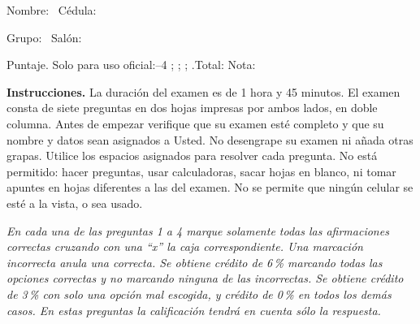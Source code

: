 \documentclass[11pt]{article}
\begin{document}
\examheader

\vspace{4pt}
\noindent Nombre: \dotfill\ Cédula: \dotfill

\vspace{4pt}
\noindent Grupo: \dotfill\ Salón: \dotfill

\vspace{4pt}
\noindent Puntaje. Solo para uso oficial:--4 \dotfill; \dotfill; \dotfill; \dotfill.\quad Total: \dotfill\quad Nota: \dotfill

\vspace{6pt}
\noindent\textbf{Instrucciones.} La duración del examen es de 1 hora y 45 minutos. El examen consta de siete preguntas en dos hojas impresas por ambos lados, en doble columna. Antes de empezar verifique que su examen esté completo y que su nombre y datos sean asignados a Usted. No desengrape su examen ni añada otras grapas. Utilice los espacios asignados para resolver cada pregunta. No está permitido: hacer preguntas, usar calculadoras, sacar hojas en blanco, ni tomar apuntes en hojas diferentes a las del examen. No se permite que ningún celular se esté a la vista, o sea usado.

\vspace{8pt}
\noindent\textit{En cada una de las preguntas 1 a 4 marque solamente todas las afirmaciones correctas cruzando con una ``x'' la caja correspondiente. Una marcación incorrecta anula una correcta. Se obtiene crédito de 6\,\% marcando todas las opciones correctas y no marcando ninguna de las incorrectas. Se obtiene crédito de 3\,\% con solo una opción mal escogida, y crédito de 0\,\% en todos los demás casos. En estas preguntas la calificación tendrá en cuenta sólo la respuesta.}
\end{document}

